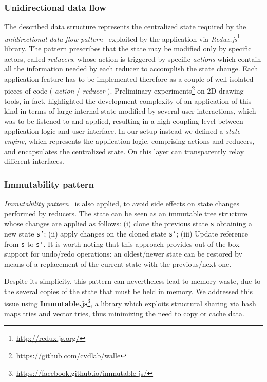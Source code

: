 \subsubsection*{Unidirectional data flow} The described data structure represents the centralized state required by the \emph{unidirectional data flow pattern}~\cite{CITARE QUALCOSA} exploited by the application via \emph{Redux.js}\footnote{\url{http://redux.js.org/}} library. The pattern prescribes that the state may be modified only by specific actors, called \emph{reducers}, whose action is triggered by specific \emph{actions} which contain all the information needed by each reducer to accomplish the state change. Each application feature has to be implemented therefore as a couple of well isolated pieces of code $($ \emph{action} / \emph{reducer} $)$. Preliminary experiments\footnote{\url{https://github.com/cvdlab/walle}} on 2D drawing tools, in fact, highlighted the development complexity of an application of this kind in terms of large internal state modified by several user interactions, which was to be listened to and applied, resulting in a high coupling level between application logic and user interface. In our setup instead we defined a \emph{state engine}, which represents the application logic, comprising actions and reducers, and encapsulates the centralized state. On this layer can transparently relay different interfaces.


\subsubsection*{Immutability pattern} \emph{Immutability pattern}~\cite{CITARE QUALCOSA} is also applied, to avoid side effects on state changes performed by reducers. The state can be seen as an immutable tree structure whose changes are applied as follows: (i) clone the previous state \texttt{s} obtaining a new state \texttt{s'}; (ii) apply changes on the cloned state \texttt{s'}; (iii) Update reference from \texttt{s} to \texttt{s'}. It is worth noting that this approach provides out-of-the-box support for undo/redo operations: an oldest/newer state can be restored by means of a replacement of the current state with the previous/next one.


Despite its simplicity, this pattern can nevertheless lead to memory waste, due to the several copies of the state that must be held in memory. We addressed this issue using \textbf{Immutable.js}\footnote{\url{https://facebook.github.io/immutable-js/}}, a library which exploits structural sharing via hash maps tries and vector tries, thus minimizing the need to copy or cache data.



